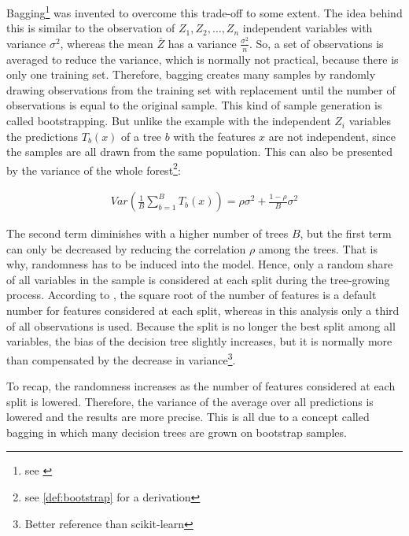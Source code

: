 \documentclass[12pt, a4paper]{scrartcl}
\theoremstyle{definition}
\begin{document}
Bagging\footnote{see \cite{breiman1996bagging}} was invented to overcome this
trade-off to some extent. The idea behind this is similar to the observation of
$Z_1, Z_2, \dots, Z_n$ independent variables with variance $\sigma^2$, whereas
the mean $\bar{Z}$ has a variance $\frac{\sigma^2}{n}$. So, a set of
observations is averaged to reduce the variance, which is normally not
practical, because there is only one training set. Therefore, bagging creates
many samples by randomly drawing observations from the training set with
replacement until the number of observations is equal to the original sample.
This kind of sample generation is called bootstrapping. But unlike the example
with the independent $Z_i$ variables the predictions $T_b(x)$ of a tree $b$
with the features $x$ are not independent, since the samples are all drawn from
the same population. This can also be presented by the variance of the whole
forest\footnote{see \ref{def:bootstrap} for a derivation}:

\begin{align*}
Var(\frac{1}{B}\sum^B_{b = 1} T_b(x)) = \rho\sigma^2 + \frac{1-\rho}{B}\sigma^2
\end{align*}

The second term diminishes with a higher number of trees $B$, but the first
term can only be decreased by reducing the correlation $\rho$ among the trees.
That is why, randomness has to be induced into the model. Hence, only a random
share of all variables in the sample is considered at each split during the
tree-growing process. According to \cite{friedman2009elements}, the square root
of the number of features is a default number for features considered at each
split, whereas in this analysis only a third of all observations is used.
Because the split is no longer the best split among all variables, the bias of
the decision tree slightly increases, but it is normally more than compensated
by the decrease in variance\footnote{Better reference than scikit-learn}.

To recap, the randomness increases as the number of features considered at each
split is lowered. Therefore, the variance of the average over all predictions
is lowered and the results are more precise. This is all due to a concept
called bagging in which many decision trees are grown on bootstrap samples.
\end{document}
